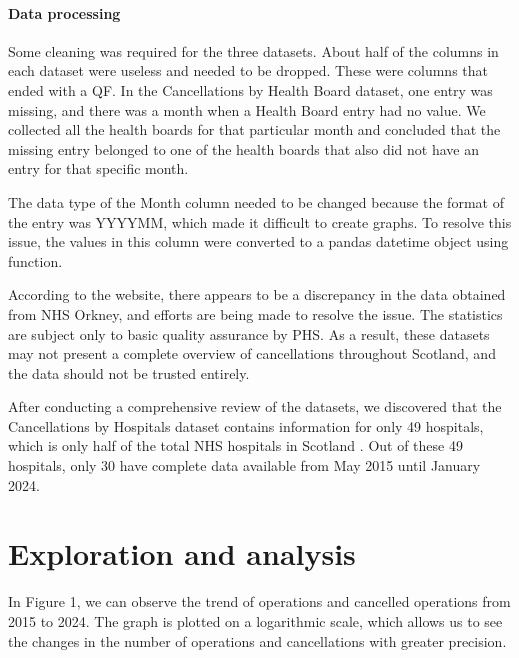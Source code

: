 \documentclass[11pt,a4paper]{article}
\begin{document}
\paragraph{Data processing} 
Some cleaning was required for the three datasets. About half of the columns in each dataset were useless and needed to be dropped. These were columns that ended with a QF. In the Cancellations by Health Board dataset, one entry was missing, and there was a month when a Health Board entry had no value. We collected all the health boards for that particular month and concluded that the missing entry belonged to one of the health boards that also did not have an entry for that specific month.

The data type of the Month column needed to be changed because the format of the entry was YYYYMM, which made it difficult to create graphs. To resolve this issue, the values in this column were converted to a pandas datetime object using   function.

According to the website, there appears to be a discrepancy in the data obtained from NHS Orkney, and efforts are being made to resolve the issue. The statistics are subject only to basic quality assurance by PHS. As a result, these datasets may not present a complete overview of cancellations throughout Scotland, and the data should not be trusted entirely.

After conducting a comprehensive review of the datasets, we discovered that the Cancellations by Hospitals dataset contains information for only 49 hospitals, which is only half of the total NHS hospitals in Scotland \cite{hospital_scotland}. Out of these 49 hospitals, only 30 have complete data available from May 2015 until January 2024.



\section{Exploration and  analysis}

In Figure 1, we can observe the trend of operations and cancelled operations from 2015 to 2024. The graph is plotted on a logarithmic scale, which allows us to see the changes in the number of operations and cancellations with greater precision.
\end{document}

